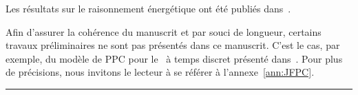 \begin{center}
\begin{minipage}{\textwidth}
{      Les résultats sur le raisonnement énergétique ont été publiés
      dans~\cite{Nattaf_CPDP,Nattaf_Constraints,Nattaf_ORSpectrum}.

      Afin d'assurer la cohérence du manuscrit et par souci de
      longueur, certains travaux préliminaires ne sont pas présentés
      dans ce manuscrit. C'est le cas, par exemple, du modèle de PPC
      pour le \CECSP~à temps discret présenté
      dans~\cite{Nattaf_JFPC}. Pour plus de précisions, nous invitons
      le lecteur à se référer à l'annexe~\ref{ann:JFPC}.
 }
    \vspace{0.5cm}
    \hrule
  \end{minipage}
\end{center}




